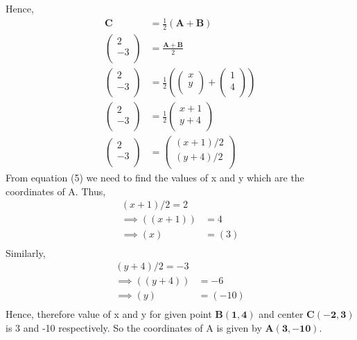 \documentclass[12pt]{article}
\providecommand{\brak}[1]{\ensuremath{\left(#1\right)}}
\newcommand{\myvec}[1]{\ensuremath{\begin{pmatrix}#1\end{pmatrix}}}
\let\vec\mathbf
\begin{document}
\begin{enumerate}
Hence,	
	\begin{align}
	\vec{C} &= \frac{1}{2}\vec{(A+B)}\\
	\myvec{
	    2\\
	   -3\\
		} &= \frac{\vec{A+B}}{2} \\
		\myvec{
	    2\\
	   -3\\
		} &= \frac{1}{2}\brak{\myvec{x\\y\\}+\myvec{1\\4\\}} \\
		\myvec{
	    2\\
	   -3\\
		} &= \frac{1}{2}\myvec{x+1\\y+4\\}\\
		\myvec{
	    2\\
	   -3\\
		} &= \myvec{(x+1)/2\\(y+4)/2\\}	
	\end{align}       
	 From equation (5) we need to find the values of x and y which are the coordinates of A. Thus,
    \begin{align}	                     
	{(x+1)/2} = 2\\
	\implies  
	\brak{(x+1)}& = 4 \\
	\implies 
	\brak{x}& = (3)\\
    \end{align}
    Similarly,
    \begin{align}
    {(y+4)/2} = -3\\
    \implies
    \brak{(y+4)}& = -6 \\
    \implies
    \brak {y}& = (-10)\\
    \end{align}
    Hence, therefore value of x and y for given point $\vec{B(1,4)}$ and center $\vec{C(-2,3)}$ is 3 and -10 respectively. So the coordinates of A is given by 
  $\vec{A(3,-10)}$.	
\hspace{3mm}
\begin{figure}[!h]
\begin{center}	

\end{center}
\end{figure}
\end{enumerate}
\end{document}

